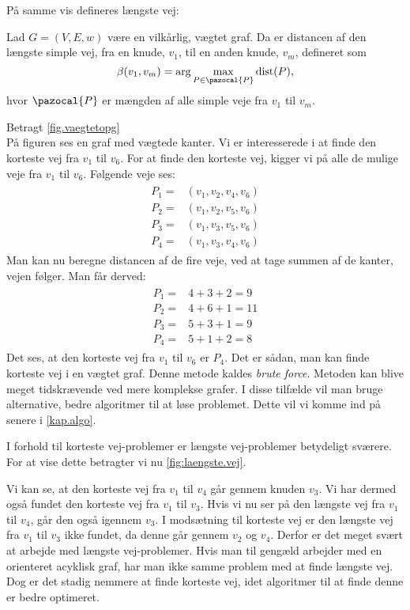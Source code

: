 På samme vis defineres længste vej:

\begin{defn} 
	Lad $G=(V,E,w)$ være en vilkårlig, vægtet graf. Da er distancen af den længste simple vej, fra en knude, $v_1$, til en anden knude, $v_m$, defineret som
	\begin{equation}
		\beta(v_1,v_m)=\arg \max_{P \in \pazocal{P}}
		\textrm{dist}(P),
	\end{equation}
	hvor $\pazocal{P}$ er mængden af alle simple veje fra $v_1$ til $v_m$.
\end{defn}

\begin{exmp}
Betragt \autoref{fig.vaegtetopg} \\

På figuren ses en graf med vægtede kanter. Vi er interesserede i at finde den korteste vej fra $v_1$ til $v_6$. For at finde den korteste vej, kigger vi på alle de mulige veje fra $v_1$ til $v_6$.
Følgende veje ses:
\begin{align}
\begin{split}
	P_1=&(v_1,v_2,v_4,v_6)\\
	P_2=&(v_1,v_2,v_5,v_6)\\
	P_3=&(v_1,v_3,v_5,v_6)\\
	P_4=&(v_1,v_3,v_4,v_6)
\end{split}
\end{align}
Man kan nu beregne distancen af de fire veje, ved at tage summen af de kanter, vejen følger. Man får derved:
\begin{align}
\begin{split}
	P_1=&4+3+2=9\\
	P_2=&4+6+1=11\\
	P_3=&5+3+1=9\\
	P_4=&5+1+2=8
\end{split}
\end{align}
Det ses, at den korteste vej fra $v_1$ til $v_6$ er $P_4$. 
Det er sådan, man kan finde korteste vej i en vægtet graf. Denne metode kaldes \emph{brute force}. Metoden kan blive meget tidskrævende ved mere komplekse grafer. I disse tilfælde vil man bruge alternative, bedre algoritmer til at løse problemet. Dette vil vi komme ind på senere i \autoref{kap.algo}.
\end{exmp}

I forhold til korteste vej-problemer er længste vej-problemer betydeligt sværere. For at vise dette betragter vi nu \autoref{fig:laengste.vej}.

Vi kan se, at den korteste vej fra $v_1$ til $v_4$ går gennem knuden $v_3$. Vi har dermed også fundet den korteste vej fra $v_1$ til $v_3$.
Hvis vi nu ser på den længste vej fra $v_1$ til $v_4$, går den også igennem $v_3$. I modsætning til korteste vej er den længste vej fra $v_1$ til $v_3$ ikke fundet, da denne går gennem $v_2$ og $v_4$. Derfor er det meget svært at arbejde med længste vej-problemer.
Hvis man til gengæld arbejder med en orienteret acyklisk graf, har man ikke samme problem med at finde længste vej. Dog er det stadig nemmere at finde korteste vej, idet algoritmer til at finde denne er bedre optimeret.
